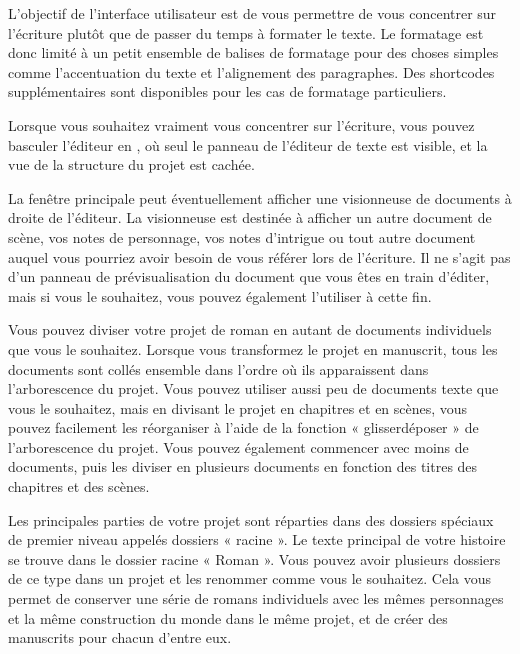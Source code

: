 \documentclass[a4paper,11pt,french]{sphinxmanual}
\begin{document}
\begin{description}
\sphinxAtStartPar
L’objectif de l’interface utilisateur est de vous permettre de vous concentrer sur l’écriture plutôt que de passer du temps à formater le texte. Le formatage est donc limité à un petit ensemble de balises de formatage pour des choses simples comme l’accentuation du texte et l’alignement des paragraphes. Des shortcodes supplémentaires sont disponibles pour les cas de formatage particuliers.

\sphinxAtStartPar
Lorsque vous souhaitez vraiment vous concentrer sur l’écriture, vous pouvez basculer l’éditeur en , où seul le panneau de l’éditeur de texte est visible, et la vue de la structure du projet est cachée.

\sphinxAtStartPar
La fenêtre principale peut éventuellement afficher une visionneuse de documents à droite de l’éditeur. La visionneuse est destinée à afficher un autre document de scène, vos notes de personnage, vos notes d’intrigue ou tout autre document auquel vous pourriez avoir besoin de vous référer lors de l’écriture. Il ne s’agit pas d’un panneau de prévisualisation du document que vous êtes en train d’éditer, mais si vous le souhaitez, vous pouvez également l’utiliser à cette fin.

\sphinxAtStartPar
Vous pouvez diviser votre projet de roman en autant de documents individuels que vous le souhaitez. Lorsque vous transformez le projet en manuscrit, tous les documents sont collés ensemble dans l’ordre où ils apparaissent dans l’arborescence du projet. Vous pouvez utiliser aussi peu de documents texte que vous le souhaitez, mais en divisant le projet en chapitres et en scènes, vous pouvez facilement les réorganiser à l’aide de la fonction « glisser\sphinxhyphen{}déposer » de l’arborescence du projet. Vous pouvez également commencer avec moins de documents, puis les diviser en plusieurs documents en fonction des titres des chapitres et des scènes.

\sphinxAtStartPar
Les principales parties de votre projet sont réparties dans des dossiers spéciaux de premier niveau appelés dossiers « racine ». Le texte principal de votre histoire se trouve dans le dossier racine « Roman ». Vous pouvez avoir plusieurs dossiers de ce type dans un projet et les renommer comme vous le souhaitez. Cela vous permet de conserver une série de romans individuels avec les mêmes personnages et la même construction du monde dans le même projet, et de créer des manuscrits pour chacun d’entre eux.


\end{description}
\end{document}
